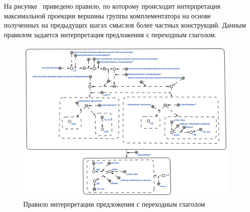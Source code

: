 На рисунке~\textit{} приведено правило, по которому происходит интерпретация максимальной проекции вершины группы комплементатора на основе полученных на предыдущих шагах смыслов более частных конструкций.
Данным правилом задается интерпретация предложения с переходным глаголом.

\begin{figure}[h]
    \centering
    \includegraphics[scale=0.8]{images/part2/chapter_lang/d_sem_7}
    \caption{Правило интерпретации предложения с переходным глаголом}
    \label{fig:d_sem_7}
\end{figure}

%